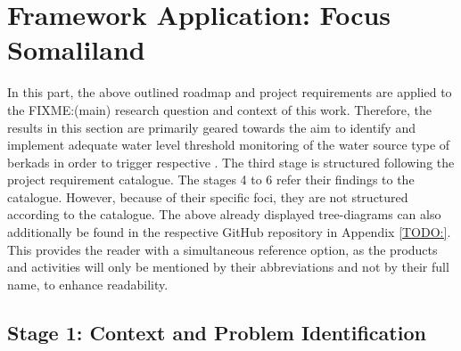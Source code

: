 

\section{Framework Application: Focus Somaliland}

In this part, the above outlined roadmap and project requirements are applied to the FIXME:(main) research question and context of this work. Therefore, the results in this section are primarily geared towards the aim to identify and implement adequate water level threshold monitoring of the water source type of berkads in order to trigger respective . The third stage is structured following the project requirement catalogue. The stages 4 to 6 refer their findings to the catalogue. However, because of their specific foci, they are not structured according to the catalogue. The above already displayed tree-diagrams can also additionally be found in the respective GitHub repository in Appendix \ref*{TODO:}. This provides the reader with a simultaneous reference option, as the products and activities will only be mentioned by their abbreviations and not by their full name, to enhance readability.

\subsection{Stage 1: Context and Problem Identification}\label{subsec:stage1_appl}


